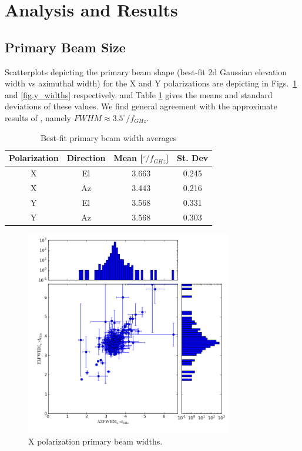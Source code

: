 \documentclass[preprint]{aastex}
\begin{document}
\section{Analysis and Results}\label{s.results}

\subsection{Primary Beam Size}\label{ss.beamsize}
Scatterplots depicting the primary beam shape (best-fit 2d Gaussian
elevation width vs azimuthal width) for the X and Y polarizations are
depicting in Figs.~\ref{fig.x_widths} and \ref{fig.y_widths}
respectively, and Table \ref{tab.widths} gives the means and standard
deviations of these values.  We find general agreement with the
approximate results of \citet{Harp2011}, namely $FWHM \approx
3.5^{\circ} / f_{GHz}$.

\begin{table}[!h]
\begin{center}
\begin{tabular}{|c|c|c|c|} \hline
Polarization & Direction & Mean [$^{\circ} / f_{GHz}$] & St. Dev \\
\hline
\hline
X & El & 3.663 & 0.245\\
\hline
X & Az & 3.443 & 0.216 \\
\hline
Y & El & 3.568 & 0.331 \\
\hline
Y & Az & 3.568 & 0.303\\
\hline
\end{tabular}
\caption{Best-fit primary beam width averages \label{tab.widths}}
\end{center}
\end{table}

\begin{figure}[h!]
\begin{center}
\includegraphics[width=0.8\textwidth]{images/x_widths.png}
\caption{X polarization primary beam widths. \label{fig.x_widths}}
\end{center}
\end{figure}
\end{document}
